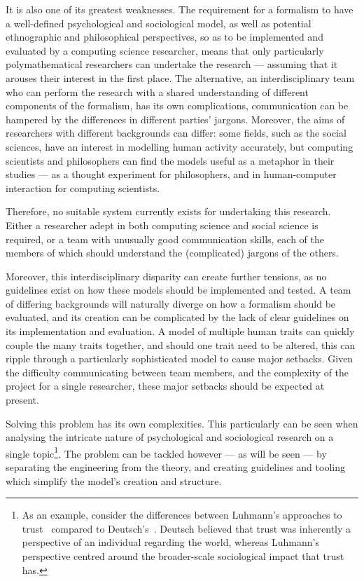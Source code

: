 It is also one of its greatest weaknesses. The requirement for a formalism to have a well-defined psychological and sociological model, as well as potential ethnographic and philosophical perspectives, so as to be implemented and evaluated by a computing science researcher, means that only particularly polymathematical researchers can undertake the research --- assuming that it arouses their interest in the first place. The alternative, an interdisciplinary team who can perform the research with a shared understanding of different components of the formalism, has its own complications, communication can be hampered by the differences in different parties' jargons. Moreover, the aims of researchers with different backgrounds can differ: some fields, such as the social sciences, have an interest in modelling human activity accurately, but computing scientists and philosophers can find the models useful as a metaphor in their studies --- as a thought experiment for philosophers, and in human-computer interaction for computing scientists.\par

Therefore, no suitable system currently exists for undertaking this research. Either a researcher adept in both computing science and social science is required, or a team with unusually good communication skills, each of the members of which should understand the (complicated) jargons of the others.\par

Moreover, this interdisciplinary disparity can create further tensions, as no guidelines exist on how these models should be implemented and tested. A team of differing backgrounds will naturally diverge on how a formalism should be evaluated, and its creation can be complicated by the lack of clear guidelines on its implementation and evaluation. A model of multiple human traits can quickly couple the many traits together, and should one trait need to be altered, this can ripple through a particularly sophisticated model to cause major setbacks. Given the difficulty communicating between team members, and the complexity of the project for a single researcher, these major setbacks should be expected at present.\par

Solving this problem has its own complexities. This particularly can be seen when analysing the intricate nature of psychological and sociological research on a single topic\footnote{As an example, consider the differences between Luhmann's approaches to trust~\cite{luhmann2000familiarity} compared to Deutsch's~\cite{deutsch1962cooperation}. Deutsch believed that trust was inherently a perspective of an individual regarding the world, whereas Luhmann's perspective centred around the broader-scale sociological impact that trust has.}. The problem can be tackled however --- as will be seen --- by separating the engineering from the theory, and creating guidelines and tooling which simplify the model's creation and structure.\par
